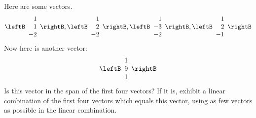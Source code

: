 \begin{enumialphparenastyle}
\begin{ex} Here are some vectors. 
\begin{equation*}
\leftB 
\begin{array}{r}
1 \\ 
1 \\ 
-2
\end{array}
\rightB ,\leftB 
\begin{array}{r}
1 \\ 
2 \\ 
-2
\end{array}
\rightB ,\leftB 
\begin{array}{r}
1 \\ 
-3 \\ 
-2
\end{array}
\rightB ,\leftB 
\begin{array}{r}
1 \\ 
2 \\ 
-1
\end{array}
\rightB
\end{equation*}
Now here is another vector:\ 
\begin{equation*}
\leftB 
\begin{array}{r}
1 \\ 
9 \\ 
1
\end{array}
\rightB 
\end{equation*}
Is this vector in the span of the first four vectors? If it is, exhibit a
linear combination of the first four vectors which equals this vector, using
as few vectors as possible in the linear combination. 
\end{ex}


\end{enumialphparenastyle}
